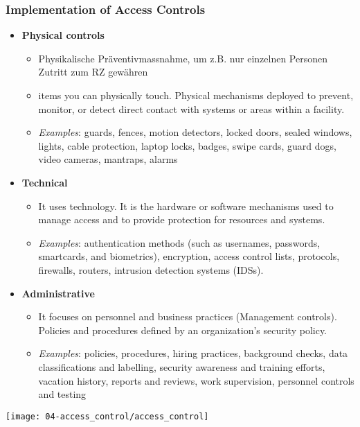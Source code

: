 \subsubsection{Implementation of Access Controls}\label{subsubsec:implementation-of-access-controls}
\begin{itemize}
    \item \textbf{Physical controls}
    \begin{itemize}
        \item Physikalische Präventivmassnahme, um z.B. nur einzelnen Personen Zutritt zum RZ gewähren
        \item items you can physically touch. Physical mechanisms deployed to prevent, monitor, or detect direct contact with systems or areas within a facility.
        \item \textit{Examples}: guards, fences, motion detectors, locked doors, sealed windows, lights, cable protection, laptop locks, badges, swipe cards, guard dogs, video cameras, mantraps, alarms
    \end{itemize}
    \item \textbf{Technical}
    \begin{itemize}
        \item It uses technology. It is the hardware or software mechanisms used to manage access and to provide protection for resources and systems.
        \item \textit{Examples}: authentication methods (such as usernames, passwords, smartcards, and biometrics), encryption, access control lists, protocols, firewalls, routers, intrusion detection systems (IDSs).
    \end{itemize}
    \item \textbf{Administrative}
    \begin{itemize}
        \item It focuses on personnel and business practices (Management controls). Policies and procedures defined by an organization's security policy.
        \item \textit{Examples}: policies, procedures, hiring practices, background checks, data classifications and labelling, security awareness and training efforts, vacation history, reports and reviews, work supervision, personnel controls and testing
    \end{itemize}
\end{itemize}

\begin{center}
    \texttt{[image: 04-access\_control/access\_control]}
    \vspace{-8pt}
\end{center}


